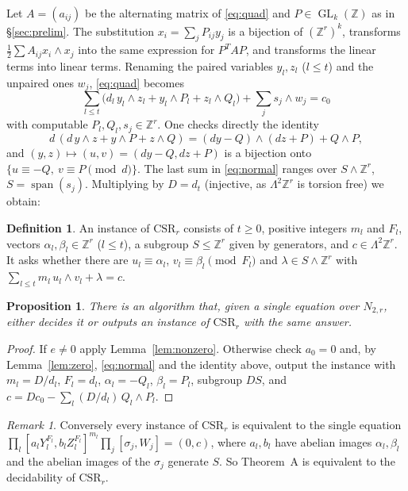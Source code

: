 \documentclass[11pt]{amsart}
\newtheorem{proposition}[theorem]{Proposition}
\theoremstyle{definition}
\newtheorem{definition}[theorem]{Definition}
\theoremstyle{remark}
\newtheorem{remark}[theorem]{Remark}
\newcommand{\Z}{\mathbb{Z}}
\newcommand{\w}{\wedge}
\newcommand{\GL}{\operatorname{GL}}
\newcommand{\spn}{\operatorname{span}}
\begin{document}
Let $A=(a_{ij})$ be the alternating matrix of \eqref{eq:quad} and $P\in\GL_k(\Z)$ as
in \S\ref{sec:prelim}. The substitution $x_i=\sum_jP_{ij}y_j$ is a bijection of
$(\Z^r)^k$, transforms $\tfrac12\sum A_{ij}x_i\w x_j$ into the same expression for
$P^TAP$, and transforms the linear terms into linear terms. Renaming the paired
variables $y_l,z_l$ ($l\le t$) and the unpaired ones $w_j$, \eqref{eq:quad} becomes
\begin{equation}\label{eq:normal}
\sum_{l\le t}\big(d_l\,y_l\w z_l+y_l\w P_l+z_l\w Q_l\big)+\sum_j s_j\w w_j=c_0
\end{equation}
with computable $P_l,Q_l,s_j\in\Z^r$. One checks directly the identity
\[d\,(d\,y\w z+y\w P+z\w Q)=(dy-Q)\w(dz+P)+Q\w P,\]
and $(y,z)\mapsto(u,v)=(dy-Q,dz+P)$ is a bijection onto
$\{u\equiv -Q,\ v\equiv P\pmod d\}$. The last sum in \eqref{eq:normal} ranges over
$S\w\Z^r$, $S=\spn(s_j)$. Multiplying by $D=d_t$ (injective, as $\Lambda^2\Z^r$ is
torsion free) we obtain:

\begin{definition}\label{def:csr}
An instance of $\mathrm{CSR}_r$ consists of $t\ge0$, positive integers $m_l$ and
$F_l$, vectors $\alpha_l,\beta_l\in\Z^r$ ($l\le t$), a subgroup $S\le\Z^r$ given by
generators, and $c\in\Lambda^2\Z^r$. It asks whether there are $u_l\equiv\alpha_l$,
$v_l\equiv\beta_l\pmod{F_l}$ and $\lambda\in S\w\Z^r$ with
$\sum_{l\le t}m_l\,u_l\w v_l+\lambda=c$.
\end{definition}

\begin{proposition}\label{prop:reduction}
There is an algorithm that, given a single equation over $N_{2,r}$, either decides
it or outputs an instance of $\mathrm{CSR}_r$ with the same answer.
\end{proposition}

\begin{proof}
If $e\ne0$ apply Lemma~\ref{lem:nonzero}. Otherwise check $a_0=0$ and, by
Lemma~\ref{lem:zero}, \eqref{eq:normal} and the identity above, output the instance
with $m_l=D/d_l$, $F_l=d_l$, $\alpha_l=-Q_l$, $\beta_l=P_l$, subgroup $DS$, and
$c=Dc_0-\sum_l(D/d_l)\,Q_l\w P_l$.
\end{proof}

\begin{remark}
Conversely every instance of $\mathrm{CSR}_r$ is equivalent to the single equation
$\prod_l[a_lY_l^{F_l},b_lZ_l^{F_l}]^{m_l}\prod_j[\sigma_j,W_j]=(0,c)$, where $a_l,b_l$
have abelian images $\alpha_l,\beta_l$ and the abelian images of the $\sigma_j$
generate $S$. So Theorem~A is equivalent to the decidability of $\mathrm{CSR}_r$.
\end{remark}
\end{document}
